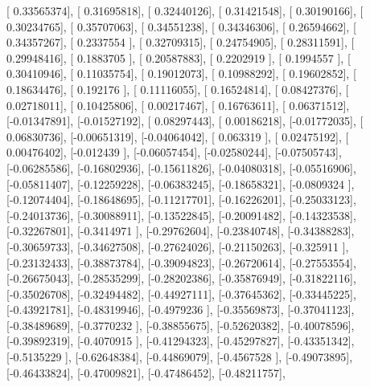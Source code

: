 \documentclass{article}
\begin{document}
       [ 0.33565374],
       [ 0.31695818],
       [ 0.32440126],
       [ 0.31421548],
       [ 0.30190166],
       [ 0.30234765],
       [ 0.35707063],
       [ 0.34551238],
       [ 0.34346306],
       [ 0.26594662],
       [ 0.34357267],
       [ 0.2337554 ],
       [ 0.32709315],
       [ 0.24754905],
       [ 0.28311591],
       [ 0.29948416],
       [ 0.1883705 ],
       [ 0.20587883],
       [ 0.2202919 ],
       [ 0.1994557 ],
       [ 0.30410946],
       [ 0.11035754],
       [ 0.19012073],
       [ 0.10988292],
       [ 0.19602852],
       [ 0.18634476],
       [ 0.192176  ],
       [ 0.11116055],
       [ 0.16524814],
       [ 0.08427376],
       [ 0.02718011],
       [ 0.10425806],
       [ 0.00217467],
       [ 0.16763611],
       [ 0.06371512],
       [-0.01347891],
       [-0.01527192],
       [ 0.08297443],
       [ 0.00186218],
       [-0.01772035],
       [ 0.06830736],
       [-0.00651319],
       [-0.04064042],
       [ 0.063319  ],
       [ 0.02475192],
       [ 0.00476402],
       [-0.012439  ],
       [-0.06057454],
       [-0.02580244],
       [-0.07505743],
       [-0.06285586],
       [-0.16802936],
       [-0.15611826],
       [-0.04080318],
       [-0.05516906],
       [-0.05811407],
       [-0.12259228],
       [-0.06383245],
       [-0.18658321],
       [-0.0809324 ],
       [-0.12074404],
       [-0.18648695],
       [-0.11217701],
       [-0.16226201],
       [-0.25033123],
       [-0.24013736],
       [-0.30088911],
       [-0.13522845],
       [-0.20091482],
       [-0.14323538],
       [-0.32267801],
       [-0.3414971 ],
       [-0.29762604],
       [-0.23840748],
       [-0.34388283],
       [-0.30659733],
       [-0.34627508],
       [-0.27624026],
       [-0.21150263],
       [-0.325911  ],
       [-0.23132433],
       [-0.38873784],
       [-0.39094823],
       [-0.26720614],
       [-0.27553554],
       [-0.26675043],
       [-0.28535299],
       [-0.28202386],
       [-0.35876949],
       [-0.31822116],
       [-0.35026708],
       [-0.32494482],
       [-0.44927111],
       [-0.37645362],
       [-0.33445225],
       [-0.43921781],
       [-0.48319946],
       [-0.4979236 ],
       [-0.35569873],
       [-0.37041123],
       [-0.38489689],
       [-0.3770232 ],
       [-0.38855675],
       [-0.52620382],
       [-0.40078596],
       [-0.39892319],
       [-0.4070915 ],
       [-0.41294323],
       [-0.45297827],
       [-0.43351342],
       [-0.5135229 ],
       [-0.62648384],
       [-0.44869079],
       [-0.4567528 ],
       [-0.49073895],
       [-0.46433824],
       [-0.47009821],
       [-0.47486452],
       [-0.48211757],
\end{document}
